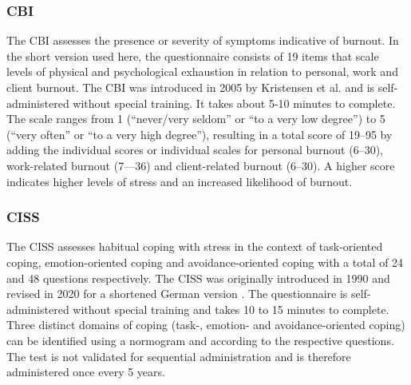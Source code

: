 \QPsychometrics{}

\subsubsection{\acf{CBI}}
\label{questionnaires:CBI}
The \acl{CBI} assesses the presence or severity of symptoms indicative of burnout. In the short version used here, the questionnaire consists of 19 items that scale levels of physical and psychological exhaustion in relation to personal, work and client burnout. The CBI was introduced in 2005 by Kristensen et al. \cite{kristensen2005cbi} and is self-administered without special training. It takes about 5-10 minutes to complete. The scale ranges from 1 (``never/very seldom'' or ``to a very low degree'') to 5 (``very often'' or ``to a very high degree''), resulting in a total score of 19--95 by adding the individual scores or individual scales for personal burnout (6--30), work-related burnout (7---36) and client-related burnout (6--30). A higher score indicates higher levels of stress and an increased likelihood of burnout.

\QPsychometrics{}

\subsubsection{\acf{CISS}}
\label{questionnaires:CISS}
The \acl{CISS} assesses habitual coping with stress in the context of task-oriented coping, emotion-oriented coping and avoidance-oriented coping with a total of 24 and 48 questions respectively. The CISS was originally introduced in 1990 \cite{endler1990ciss} and revised in 2020 for a shortened German version \cite{kalin2020ciss}. The questionnaire is self-administered without special training and takes 10 to 15 minutes to complete. Three distinct domains of coping (task-, emotion- and avoidance-oriented coping) can be identified using a normogram and according to the respective questions. The test is not validated for sequential administration and is therefore administered once every 5 years.

\QPsychometrics{}

